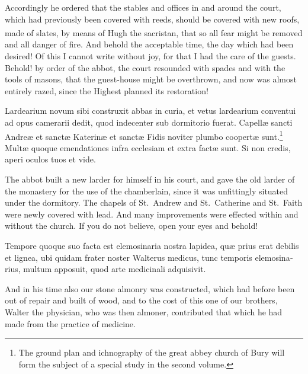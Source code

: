 \documentclass[10pt]{book}
\newcounter{engnote}
\newcommand{\engnotenum}{\textsuperscript{\arabic{engnote}\stepcounter{engnote}}}
\begin{document}
\begin{paracol}{2}
\switchcolumn

Accordingly he ordered that the stables and offices in and around the court, which had previously been covered with reeds, should be covered with new roofs, made of slates, by means of Hugh the sacristan,\engnotenum{} that so all fear might be removed and all danger of fire. And behold the acceptable time, the day which had been desired! Of this I cannot write without joy, for that I had the care of the guests. Behold! by order of the abbot, the court resounded with spades and with the tools of masons, that the guest-house might be overthrown, and now was almost entirely razed, since the Highest planned its restoration!

\switchcolumn*

\begin{otherlanguage}{latin}
Lardearium novum sibi construxit abbas in curia, et vetus lardearium conventui ad opus camerarii dedit, quod indecenter sub dormitorio fuerat. Capell\ae{} sancti Andre\ae{} et sanct\ae{} Katerin\ae{} et sanct\ae{} Fidis noviter plumbo coopert\ae{} sunt.\footnote[\textdagger]{The ground plan and ichnography of the great abbey church of Bury will form the subject of a special study in the second volume.} Mult\ae{} quoque emendationes infra ecclesiam et extra fact\ae{} sunt. Si non credis, aperi oculos tuos et vide. 
\end{otherlanguage}

\switchcolumn

The abbot built a new larder for himself in his court, and gave the old larder of the monastery for the use of the chamberlain, since it was unfittingly situated under the dormitory. The chapels of St.\ Andrew and St.\ Catherine and St.\ Faith were newly covered with lead. And many improvements were effected within and without the church. If you do not believe, open your eyes and behold!

\switchcolumn*

\begin{otherlanguage}{latin}
Tempore quoque suo facta est elemosinaria nostra lapidea, qu\ae{} prius erat debilis et lignea, ubi quidam frater noster Walterus medicus, tunc temporis elemosinarius, multum apposuit, quod arte medicinali adquisivit.
\end{otherlanguage}

\switchcolumn

And in his time also our stone almonry was constructed, which had before been out of repair and built of wood, and to the cost of this one of our brothers, Walter the physician, who was then almoner, contributed that which he had made from the practice of medicine.


\end{paracol}
\end{document}
